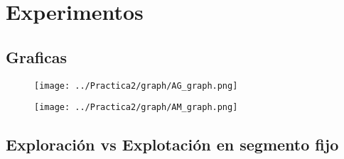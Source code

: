\newpage

\section{Experimentos}

\subsection{Graficas}
\begin{figure}[h]
   \centering
   \texttt{[image: ../Practica2/graph/AG\_graph.png]}
   \caption{}
\end{figure}

\begin{figure}[h]
   \centering
   \texttt{[image: ../Practica2/graph/AM\_graph.png]}
   \caption{}
\end{figure}

\subsection{Exploración vs Explotación en segmento fijo}
